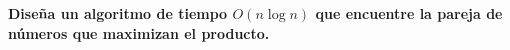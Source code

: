 \textbf{Diseña un algoritmo de tiempo $O(n \log n)$ que encuentre la pareja de números que maximizan el producto.}\vspace{.2cm}

\textcolor{bibi}{}
\begin{quote}
\end{quote}